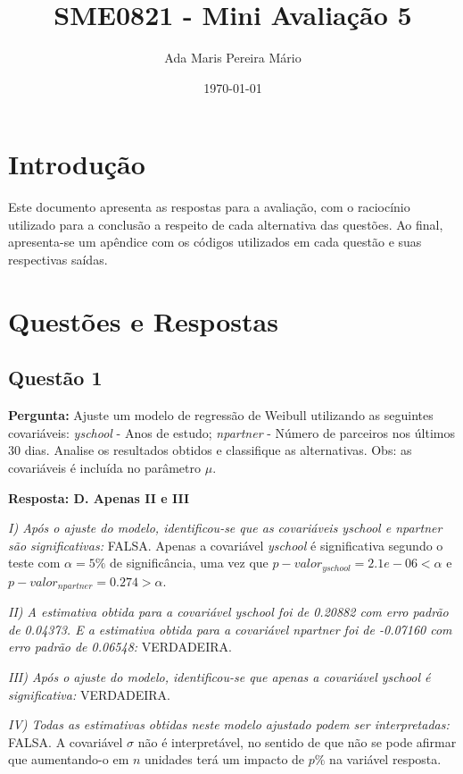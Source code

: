 \documentclass[a4paper,12pt]{article}
\title{SME0821 - Mini Avaliação 5}
\author{Ada Maris Pereira Mário}
\date{\today}
\begin{document}
\maketitle

\tableofcontents

\section{Introdução}
Este documento apresenta as respostas para a avaliação, com o raciocínio utilizado para a conclusão a respeito de cada alternativa das questões. Ao final, apresenta-se um apêndice com os códigos utilizados em cada questão e suas respectivas saídas.

\section{Questões e Respostas}
\subsection{Questão 1}
\textbf{Pergunta:} Ajuste um modelo de regressão de Weibull utilizando as seguintes covariáveis: \textit{yschool} - Anos de estudo; \textit{npartner} - Número de parceiros nos últimos 30 dias. Analise os resultados obtidos e classifique as alternativas. Obs: as covariáveis é incluída no parâmetro $\mu$.

\textbf{Resposta: D. Apenas II e III
}

\textit{I) Após o ajuste do modelo, identificou-se que as covariáveis yschool e npartner são significativas:} FALSA. Apenas a covariável \textit{yschool} é significativa segundo o teste com $\alpha = 5\%$ de significância, uma vez que $p-valor_{yschool} = 2.1e-06 < \alpha$ e $p-valor_{npartner} = 0.274 > \alpha$.

\textit{II) A estimativa obtida para a covariável yschool foi de 0.20882 com erro padrão de 0.04373. E a estimativa obtida para a covariável npartner foi de -0.07160 com erro padrão de 0.06548:} VERDADEIRA.


\textit{III) Após o ajuste do modelo, identificou-se que apenas a covariável yschool é significativa:} VERDADEIRA.

\textit{IV) Todas as estimativas obtidas neste modelo ajustado podem ser interpretadas:} FALSA. A covariável $\sigma$ não é interpretável, no sentido de que não se pode afirmar que aumentando-o em $n$ unidades terá um impacto de $p\%$ na variável resposta.
\end{document}
